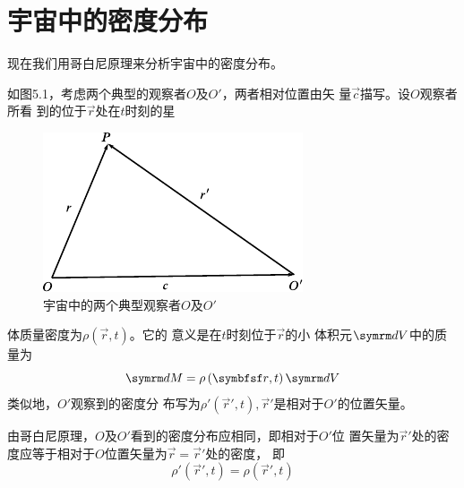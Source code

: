 \section{宇宙中的密度分布}\label{sec:05.02}

现在我们用哥白尼原理来分析宇宙中的密度分布。

如图5.1，考虑两个典型的观察者$ O $及$  O'   $，两者相对位置由矢
量$ \vec{c} $描写。设$ O $观察者所看
到的位于$ \vec{r} $处在$ t $时刻的星
\begin{figure}
  \centering
  \includegraphics{figure/fig05.01}
  \caption{宇宙中的两个典型观察者$ O $及$ O' $}
  \label{fig:05.01}
\end{figure}
体质量密度为$  \rho \left( \vec{r} , t \right)   $。它的
意义是在$ t $时刻位于$ \vec{r} $的小
体积元$ \dif V $中的质量为
{\setlength\mathindent{3em}
\begin{equation*}
  \dif M = \rho \left( \vec{r} , t \right) \dif V
\end{equation*}}
类似地，$ O' $观察到的密度分
布写为$  \rho ' \left( \vec{r} ' , t \right)   , \vec{r} ' $是相对于$ O' $的位置矢量。

由哥白尼原理，$ O $及$ O' $看到的密度分布应相同，即相对于$ O' $位
置矢量为$ \vec{r} ' $处的密度应等于相对于$ O $位置矢量为$ \vec{r} = \vec{r} ' $处的密度，
即\vspace{-1.56em}
\begin{equation}\label{eqn:05.02.01}
  \rho ' \left( \vec{r} ' , t \right) = \rho \left( \vec{r} ' , t \right)
\end{equation}

